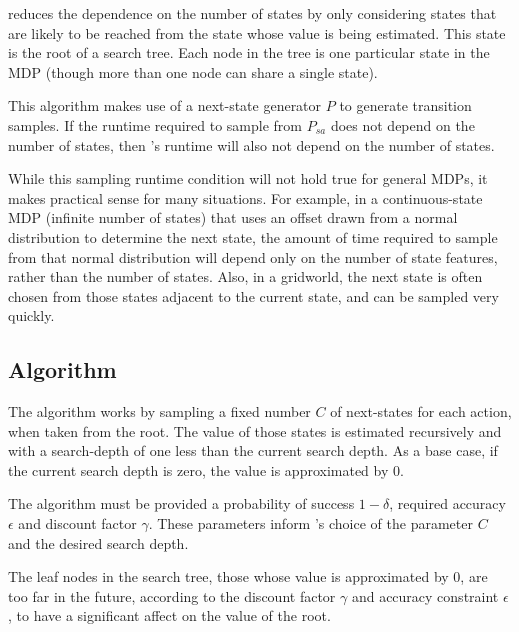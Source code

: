 
 reduces the dependence on the number of states by only considering states that are likely to be reached from the state whose value is being estimated. This state is the root of a search tree. Each node in the tree is one particular state in the MDP (though more than one node can share a single state).

This algorithm makes use of a next-state generator $P$ to generate transition samples. If the runtime required to sample from $P_{sa}$ does not depend on the number of states, then 's runtime will also not depend on the number of states.

While this sampling runtime condition will not hold true for general MDPs, it makes practical sense for many situations. For example, in a continuous-state MDP (infinite number of states) that uses an offset drawn from a normal distribution to determine the next state, the amount of time required to sample from that normal distribution will depend only on the number of state features, rather than the number of states. Also, in a gridworld, the next state is often chosen from those states adjacent to the current state, and can be sampled very quickly.

\subsection{Algorithm}


The  algorithm works by sampling a fixed number $C$ of next-states for each action, when taken from the root. The value of those states is estimated recursively and with a search-depth of one less than the current search depth. As a base case, if the current search depth is zero, the value is approximated by $0$.

The algorithm must be provided a probability of success $1-\delta$, required accuracy $\epsilon$ and discount factor $\gamma$. These parameters inform 's choice of the parameter $C$ and the desired search depth.

The leaf nodes in the search tree, those whose value is approximated by $0$, are too far in the future, according to the discount factor $\gamma$ and accuracy constraint $\epsilon$, to have a significant affect on the value of the root.



